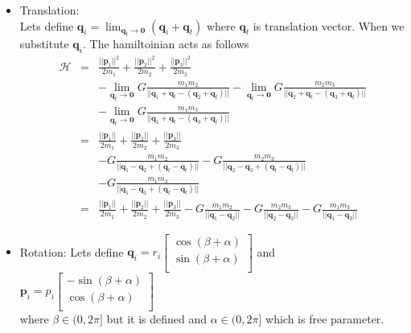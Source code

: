 \begin{itemize}
	\item Translation:\\
	Lets define $\mathbf{q}_i = \lim_{\mathbf{q}_t\rightarrow \mathbf{0}}(\mathbf{q}_i + \mathbf{q}_t)$ where $\mathbf{q}_t$ is translation vector. When we substitute $\mathbf{q}_i$. The hamiltoinian acts as follows
	\begin{eqnarray*}
		\mathcal{H} &=& \frac{||\mathbf{p}_1||^2}{2m_1} +\frac{||\mathbf{p}_2||^2}{2m_2}+\frac{||\mathbf{p}_3||^2 }{2m_3}\\
		& & - \lim_{\mathbf{q}_t\rightarrow \mathbf{0}}G\frac{m_1m_2}{||\mathbf{q}_1+ \mathbf{q}_t  - (\mathbf{q}_2+ \mathbf{q}_t) ||}-\lim_{\mathbf{q}_t\rightarrow \mathbf{0}}G\frac{m_2m_3}{||\mathbf{q}_2 + \mathbf{q}_t - (\mathbf{q}_3+ \mathbf{q}_t) ||}\\
		& &-\lim_{\mathbf{q}_t\rightarrow \mathbf{0}}G\frac{m_1m_3}{||\mathbf{q}_1+ \mathbf{q}_t  - (\mathbf{q}_3+ \mathbf{q}_t) ||}\\
		&=& \frac{||\mathbf{p}_1||}{2m_1} +\frac{||\mathbf{p}_2||}{2m_2}+\frac{||\mathbf{p}_3||}{2m_3}\\ & &-  G\frac{m_1m_2}{||\mathbf{q}_1 - \mathbf{q}_2 +(\mathbf{q}_t-\mathbf{q}_t) ||}-G\frac{m_2m_3}{||\mathbf{q}_2 - \mathbf{q}_3 +(\mathbf{q}_t-\mathbf{q}_t)||}\\
		& &-G\frac{m_1m_3}{||\mathbf{q}_1 - \mathbf{q}_3+(\mathbf{q}_t-\mathbf{q}_t)||}\\
		& = & \frac{||\mathbf{p}_1||}{2m_1} +\frac{||\mathbf{p}_2||}{2m_2}+\frac{||\mathbf{p}_3||}{2m_3} - G\frac{m_1m_2}{||\mathbf{q}_1 - \mathbf{q}_2||}-G\frac{m_2m_3}{||\mathbf{q}_2 - \mathbf{q}_3||}-G\frac{m_1m_3}{||\mathbf{q}_1 - \mathbf{q}_3||} 
	\end{eqnarray*}
	\item Rotation:
	Lets define $\mathbf{q}_i = r_i \begin{bmatrix}
		\cos(\beta + \alpha)\\
		\sin(\beta + \alpha)\\
		\end{bmatrix}$ and $\mathbf{p}_i = p_i \begin{bmatrix}
		-\sin(\beta + \alpha)\\
		\cos(\beta + \alpha)\\
		\end{bmatrix}$\\
	 where $\beta \in (0,2\pi]$ but it is defined and $\alpha \in (0,2\pi] $  which is free parameter.\\

\end{itemize}
